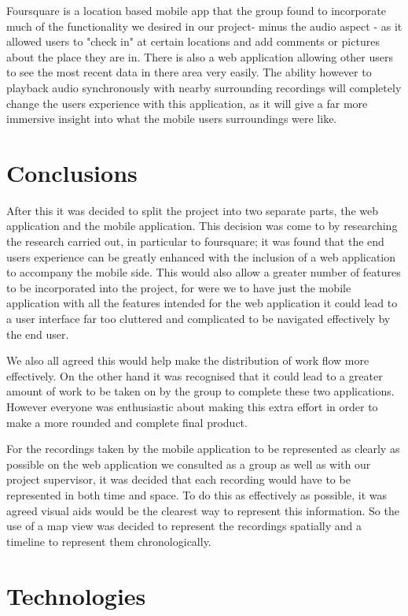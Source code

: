 \documentclass{l3proj}
\begin{document}
Foursquare is a location based mobile app that the group found to incorporate much of the functionality we desired in our project- minus the audio aspect - as it allowed users to "check in" at certain locations and add comments or pictures about the place they are in.  There is also a web application allowing other users to see the most recent data in there area very easily. The ability however to playback audio synchronously with nearby surrounding recordings will completely change the users experience with this application, as it will give a far more immersive insight into what the mobile users surroundings were like.

\section{Conclusions}

After this it was decided to split the project into two separate parts, the web application and the mobile application. This decision was come to by researching the research carried out, in particular to foursquare; it was found that the end users experience can be greatly enhanced with the inclusion of a web application to accompany the mobile side. This would also allow a greater number of features to be incorporated into the project, for were we to have just the mobile application with all the features intended for the web application it could lead to a user interface far too cluttered and complicated to be navigated effectively by the end user.

We also all agreed this would help make the distribution of work flow more effectively. On the other hand it was recognised that it could lead to a greater amount of work to be taken on by the group to complete these two applications. However everyone was enthusiastic about making this extra effort in order to make a more rounded and complete final product. 

For the recordings taken by the mobile application to be represented as clearly as possible on the web application we consulted as a group as well as with our project supervisor, it was decided that each recording would have to be represented in both time and space. To do this as effectively as possible, it was agreed visual aids would be the clearest way to represent this information. So the use of a map view was decided to represent the recordings spatially and a timeline to represent them chronologically.

\section{Technologies} 
\end{document}
